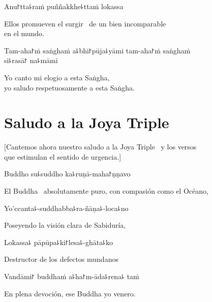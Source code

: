 Anu꜓tta꜕raṁ puññakkhe꜕ttaṁ lokassa

\begin{english}
  Ellos promueven el surgir \pause\ de un bien incomparable\\ en el mundo.
\end{english}

Tam-aha꜓ṁ saṅghaṁ a꜕bhi꜓pūja꜕yāmi tam-aha꜓ṁ saṅghaṁ\\ si꜕rasā꜓ na꜕māmi

\begin{english}
  Yo canto mi elogio a esta Saṅgha,\\
  yo saludo respetuosamente a esta Saṅgha.
\end{english}

\clearpage

\chapter{Saludo a la Joya Triple}

\begin{leader}
\end{leader}

\begin{english}
  [Cantemos ahora nuestro saludo a la Joya Triple \pause\ y los versos\\ que estimulan el sentido de urgencia.]
\end{english}

Buddho su꜕suddho ka꜕ruṇā-maha꜓ṇṇavo

\begin{english}
  El Buddha \pause\ absolutamente puro, con compasión como el Océano,
\end{english}

Yo'ccanta꜕-suddhabba꜕ra-ñāṇa꜕-loca꜕no

\begin{english}
 Poseyendo la visión clara de Sabiduría,
\end{english}

Lokassa꜕ pāpūpa꜕ki꜓lesa꜕-ghāta꜕ko

\begin{english}
  Destructor de los defectos mundanos 
\end{english}

Vandāmi꜓ buddhaṁ a꜕ha꜓m-āda꜕rena꜕ taṁ

\begin{english}
  En plena devoción, ese Buddha yo venero.
\end{english}

